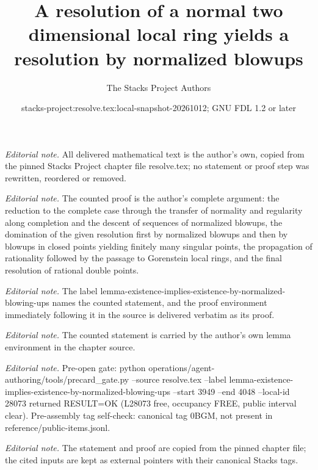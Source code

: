 \documentclass[10pt,a4paper]{amsart}
\title{A resolution of a normal two dimensional local ring yields a resolution by normalized blowups}
\author{The Stacks Project Authors}
\date{stacks-project:resolve.tex:local-snapshot-20261012; GNU FDL 1.2 or later}
\theoremstyle{plain}
\theoremstyle{definition}
\theoremstyle{remark}
\numberwithin{equation}{subsection}
\begin{document}
\maketitle
\noindent\textit{Editorial note.} All delivered mathematical text is the author's own, copied from the pinned Stacks Project chapter file resolve.tex; no statement or proof step was rewritten, reordered or removed.\par\medskip
\noindent\textit{Editorial note.} The counted proof is the author's complete argument: the reduction to the complete case through the transfer of normality and regularity along completion and the descent of sequences of normalized blowups, the domination of the given resolution first by normalized blowups and then by blowups in closed points yielding finitely many singular points, the propagation of rationality followed by the passage to Gorenstein local rings, and the final resolution of rational double points.\par\medskip
\noindent\textit{Editorial note.} The label lemma-existence-implies-existence-by-normalized-blowing-ups names the counted statement, and the proof environment immediately following it in the source is delivered verbatim as its proof.\par\medskip
\noindent\textit{Editorial note.} The counted statement is carried by the author's own lemma environment in the chapter source.\par\medskip
\noindent\textit{Editorial note.} Pre-open gate: python operations/agent-authoring/tools/precard\_gate.py --source resolve.tex --label lemma-existence-implies-existence-by-normalized-blowing-ups --start 3949 --end 4048 --local-id 28073 returned RESULT=OK (L28073 free, occupancy FREE, public interval clear). Pre-assembly tag self-check: canonical tag 0BGM, not present in reference/public-items.jsonl.\par\medskip
\noindent\textit{Editorial note.} The statement and proof are copied from the pinned chapter file; the cited inputs are kept as external pointers with their canonical Stacks tags.\par\medskip
\end{document}
